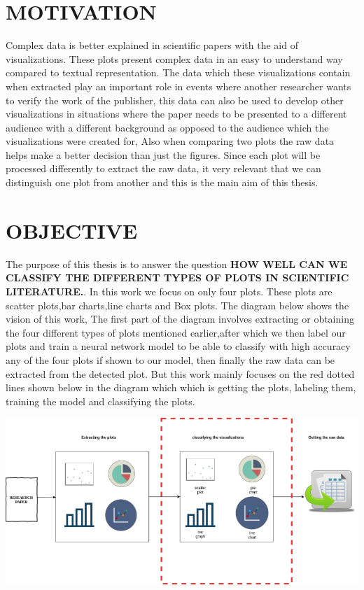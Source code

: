 \documentclass[12pt, a4paper,oneside]{report}
\begin{document}
\chapter{MOTIVATION}
Complex data is better explained in scientific papers with the aid of visualizations. These plots present complex data in an easy to understand way compared to textual representation. The data which these visualizations contain when extracted play an important role in events where another researcher wants to verify the work of the publisher, this data can also be used to develop other visualizations in situations where the paper needs to be presented to a different audience with a different background as opposed to the audience which the visualizations were created for, Also when comparing two plots the raw data helps make a better decision than just the figures. Since each plot will be processed differently to extract the raw data, it very relevant that we can distinguish one plot from another and this is the main aim of this thesis. 

\chapter{OBJECTIVE}
The purpose of this thesis is to answer the question \textbf{HOW WELL CAN WE CLASSIFY THE DIFFERENT TYPES OF PLOTS IN SCIENTIFIC LITERATURE.}. In this work we focus on only four plots. These plots are scatter plots,bar charts,line charts and Box plots. The diagram below shows the vision of this work, The first part of the diagram involves extracting or obtaining  the four different types of plots mentioned earlier,after which we then label our plots and train a neural network model to be able to classify with high accuracy any of the four plots if shown to our model, then finally the raw data can be extracted from the detected plot.
But this work mainly focuses on the red dotted lines shown below in the diagram which which is getting the plots, labeling them, training the model and classifying the plots. 
 
\includegraphics [scale=1.5] {vision}
\end{document}
